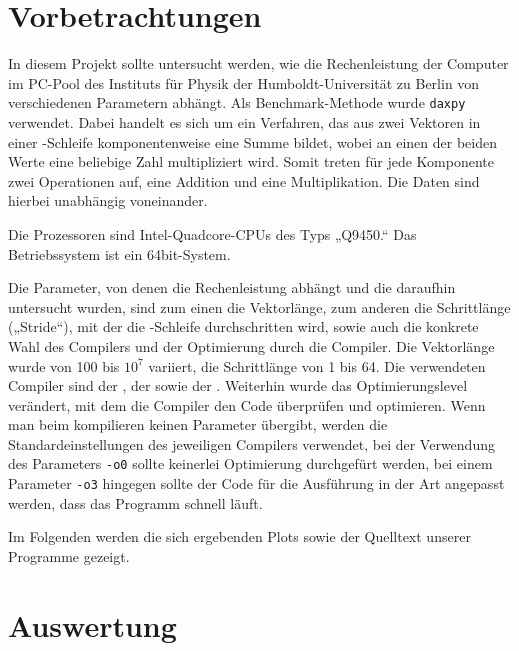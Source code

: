 \section{Vorbetrachtungen}
In diesem Projekt sollte untersucht werden, wie die Rechenleistung der Computer
im PC-Pool des Instituts für Physik der Humboldt-Universität zu Berlin von
verschiedenen Parametern abhängt. Als Benchmark-Methode wurde \texttt{daxpy}
verwendet. Dabei handelt es sich um ein Verfahren, das aus zwei Vektoren in einer \for-Schleife
komponentenweise eine Summe bildet, wobei an einen der beiden Werte eine
beliebige Zahl multipliziert wird. Somit treten für jede Komponente zwei
Operationen auf, eine Addition und eine Multiplikation. Die Daten sind hierbei 
unabhängig voneinander.

Die Prozessoren sind Intel-Quadcore-CPUs des Typs „Q9450.“ Das Betriebssystem ist
ein 64bit-System.

Die Parameter, von denen die Rechenleistung abhängt und die daraufhin untersucht
wurden, sind zum einen die Vektorlänge, zum anderen die Schrittlänge („Stride“),
mit der die \for-Schleife durchschritten wird,
sowie auch die konkrete Wahl des Compilers und der Optimierung durch die 
Compiler. Die Vektorlänge wurde von 100 bis $10^7$ variiert, die Schrittlänge 
von 1 bis 64. Die verwendeten Compiler sind der \gcc, der \icc sowie der \pgcc.
Weiterhin wurde das Optimierungslevel verändert, mit dem die Compiler den Code 
überprüfen und optimieren. Wenn man beim kompilieren keinen Parameter übergibt, 
werden die Standardeinstellungen des jeweiligen Compilers verwendet, bei der
Verwendung des Parameters \texttt{-o0} sollte keinerlei Optimierung durchgefürt
werden, bei einem Parameter \texttt{-o3} hingegen sollte der Code für die
Ausführung in der Art angepasst werden, dass das Programm schnell läuft.

Im Folgenden werden die sich ergebenden Plots sowie der Quelltext unserer Programme
gezeigt.



\section{Auswertung}


